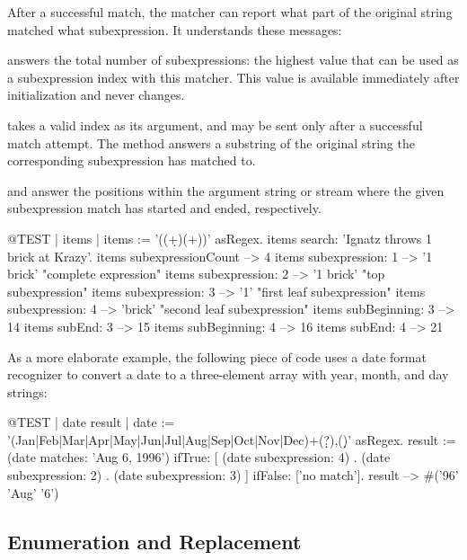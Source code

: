 \documentclass[a4paper,10pt,twoside]{book}
\begin{document}
{After a successful match, the matcher can report what part of the original string matched what subexpression. It understands these messages:

 answers the total number of subexpressions: the highest value that can be used as a subexpression index with this matcher. This value 	is available immediately after initialization and never changes.

 takes a valid index as its argument, and may be sent only after a successful match attempt. The method answers a substring of the original string the corresponding subexpression has matched to.

 and  answer the positions within the argument string or stream where the given subexpression match has started and ended, respectively. 

\begin{code}{@TEST | items |}
items := '((\d+)\s*(\w+))' asRegex.
items search: 'Ignatz throws 1 brick at Krazy'.
items subexpressionCount --> 4
items subexpression: 1      --> '1 brick'    "complete expression"
items subexpression: 2      --> '1 brick'    "top subexpression"
items subexpression: 3      --> '1'             "first leaf subexpression"
items subexpression: 4      --> 'brick'       "second leaf subexpression"
items subBeginning: 3       --> 14
items subEnd: 3                 --> 15
items subBeginning: 4       --> 16
items subEnd: 4                 --> 21
\end{code}

As a more elaborate example, the following piece of code uses a  date format recognizer to convert a date to a three-element array with year, month, and day strings:

\begin{code}{@TEST | date result |}
date := '(Jan|Feb|Mar|Apr|May|Jun|Jul|Aug|Sep|Oct|Nov|Dec)\s+(\d\d?)\s*,(\d\d)' asRegex.
result := (date matches: 'Aug 6, 1996')
       ifTrue: [{ (date subexpression: 4) .
				(date subexpression: 2) .
				(date subexpression: 3) } ]
        ifFalse: ['no match'].
result --> #('96' 'Aug' '6')
\end{code}

\subsection{Enumeration and Replacement}

}
\end{document}
